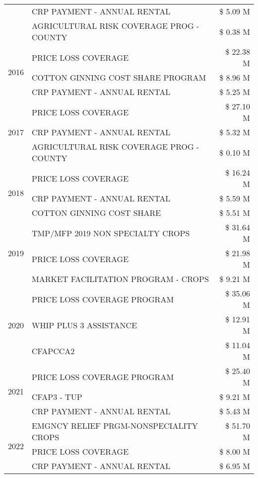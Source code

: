 \begin{tabular}{llr}
 & CRP PAYMENT - ANNUAL RENTAL & \$ 5.09 M \\
 & AGRICULTURAL RISK COVERAGE PROG - COUNTY & \$ 0.38 M \\
\cline{1-3}
\multirow[t]{3}{*}{2016} & PRICE LOSS COVERAGE & \$ 22.38 M \\
 & COTTON GINNING COST SHARE PROGRAM & \$ 8.96 M \\
 & CRP PAYMENT - ANNUAL RENTAL & \$ 5.25 M \\
\cline{1-3}
\multirow[t]{3}{*}{2017} & PRICE LOSS COVERAGE & \$ 27.10 M \\
 & CRP PAYMENT - ANNUAL RENTAL & \$ 5.32 M \\
 & AGRICULTURAL RISK COVERAGE PROG - COUNTY & \$ 0.10 M \\
\cline{1-3}
\multirow[t]{3}{*}{2018} & PRICE LOSS COVERAGE & \$ 16.24 M \\
 & CRP PAYMENT - ANNUAL RENTAL & \$ 5.59 M \\
 & COTTON GINNING COST SHARE & \$ 5.51 M \\
\cline{1-3}
\multirow[t]{3}{*}{2019} & TMP/MFP 2019 NON SPECIALTY CROPS & \$ 31.64 M \\
 & PRICE LOSS COVERAGE & \$ 21.98 M \\
 & MARKET FACILITATION PROGRAM - CROPS & \$ 9.21 M \\
\cline{1-3}
\multirow[t]{3}{*}{2020} & PRICE LOSS COVERAGE PROGRAM & \$ 35.06 M \\
 & WHIP PLUS 3 ASSISTANCE & \$ 12.91 M \\
 & CFAPCCA2 & \$ 11.04 M \\
\cline{1-3}
\multirow[t]{3}{*}{2021} & PRICE LOSS COVERAGE PROGRAM & \$ 25.40 M \\
 & CFAP3 - TUP & \$ 9.21 M \\
 & CRP PAYMENT - ANNUAL RENTAL & \$ 5.43 M \\
\cline{1-3}
\multirow[t]{3}{*}{2022} & EMGNCY RELIEF PRGM-NONSPECIALITY CROPS & \$ 51.70 M \\
 & PRICE LOSS COVERAGE & \$ 8.00 M \\
 & CRP PAYMENT - ANNUAL RENTAL & \$ 6.95 M \\
\cline{1-3}
\bottomrule
\end{tabular}

